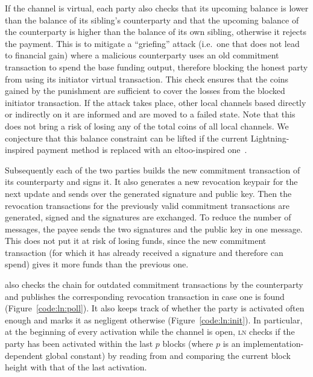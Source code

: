   If the channel is virtual, each party also checks that its upcoming balance is
  lower than the balance of its sibling's counterparty and that the upcoming
  balance of the counterparty is higher than the balance of its own sibling,
  otherwise it rejects the payment. This is to mitigate a ``griefing'' attack (i.e.\
  one that does not lead to financial gain) where a malicious counterparty
  uses an old commitment transaction to spend the base funding output, therefore
  blocking the honest party from using its initiator virtual transaction. This
  check ensures that the coins gained by the punishment are sufficient to cover
  the losses from the blocked initiator transaction. If the attack takes place,
  other local channels based directly or indirectly on it are informed and are
  moved to a failed state. Note that this does not bring a risk of losing any of
  the total coins of all local channels. We conjecture that this balance
  constraint can be lifted if the current Lightning-inspired payment method is
  replaced with an eltoo-inspired one~\cite{eltoo}.

  Subsequently each of the two parties builds the new commitment transaction of
  its counterparty and signs it. It also generates a new revocation keypair for
  the next update and sends over the generated signature and public key. Then
  the revocation transactions for the previously valid commitment transactions
  are generated, signed and the signatures are exchanged. To reduce the number
  of messages, the payee sends the two signatures and the public key in one
  message. This does not put it at risk of losing funds, since the new
  commitment transaction (for which it has already received a signature and
  therefore can spend) gives it more funds than the previous one.

  \pchan also checks the chain for outdated commitment transactions by the
  counterparty and publishes the corresponding revocation transaction in case
  one is found (Figure~\ref{code:ln:poll}). It also keeps track of whether the
  party is activated often enough and marks it as negligent otherwise
  (Figure~\ref{code:ln:init}). In particular, at the beginning of every activation
  while the channel is open, \textsc{ln} checks if the party has been activated
  within the last $p$ blocks (where $p$ is an implementation-dependent global
  constant) by reading from \ledger and comparing the current block height with
  that of the last activation.

